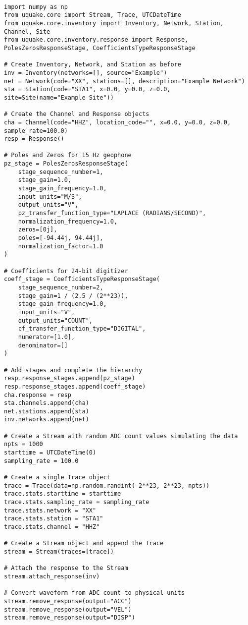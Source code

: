 \begin{verbatim}

import numpy as np
from uquake.core import Stream, Trace, UTCDateTime
from uquake.core.inventory import Inventory, Network, Station, Channel, Site
from uquake.core.inventory.response import Response, PolesZerosResponseStage, CoefficientsTypeResponseStage

# Create Inventory, Network, and Station as before
inv = Inventory(networks=[], source="Example")
net = Network(code="XX", stations=[], description="Example Network")
sta = Station(code="STA1", x=0.0, y=0.0, z=0.0, site=Site(name="Example Site"))

# Create the Channel and Response objects
cha = Channel(code="HHZ", location_code="", x=0.0, y=0.0, z=0.0, sample_rate=100.0)
resp = Response()

# Poles and Zeros for 15 Hz geophone
pz_stage = PolesZerosResponseStage(
    stage_sequence_number=1,
    stage_gain=1.0,
    stage_gain_frequency=1.0,
    input_units="M/S",
    output_units="V",
    pz_transfer_function_type="LAPLACE (RADIANS/SECOND)",
    normalization_frequency=1.0,
    zeros=[0j],
    poles=[-94.44j, 94.44j],
    normalization_factor=1.0
)

# Coefficients for 24-bit digitizer
coeff_stage = CoefficientsTypeResponseStage(
    stage_sequence_number=2,
    stage_gain=1 / (2.5 / (2**23)),
    stage_gain_frequency=1.0,
    input_units="V",
    output_units="COUNT",
    cf_transfer_function_type="DIGITAL",
    numerator=[1.0],
    denominator=[]
)

# Add stages and complete the hierarchy
resp.response_stages.append(pz_stage)
resp.response_stages.append(coeff_stage)
cha.response = resp
sta.channels.append(cha)
net.stations.append(sta)
inv.networks.append(net)

# Create a Stream with random ADC count values simulating the data
npts = 1000
starttime = UTCDateTime(0)
sampling_rate = 100.0

# Create a single Trace object
trace = Trace(data=np.random.randint(-2**23, 2**23, npts))
trace.stats.starttime = starttime
trace.stats.sampling_rate = sampling_rate
trace.stats.network = "XX"
trace.stats.station = "STA1"
trace.stats.channel = "HHZ"

# Create a Stream object and append the Trace
stream = Stream(traces=[trace])

# Attach the response to the Stream
stream.attach_response(inv)

# Convert waveform from ADC count to physical units
stream.remove_response(output="ACC")
stream.remove_response(output="VEL")
stream.remove_response(output="DISP")
\end{verbatim}

